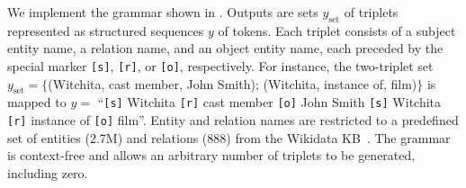 We implement the grammar shown in .
Outputs are sets $y_\text{set}$ of triplets represented as structured sequences $y$ of tokens.
Each triplet consists of a subject entity name, a relation name, and an object entity name, each preceded by the special marker \texttt{[s]}, \texttt{[r]}, or \texttt{[o]}, respectively.
For instance, the two-triplet set
$y_\text{set}=\{$(Witchita, cast member, John Smith);
(Witchita, instance of, film)$\}$
is mapped to $y=$ ``\texttt{[s]} Witchita \texttt{[r]} cast member \texttt{[o]} John Smith \texttt{[s]} Witchita \texttt{[r]} instance of \texttt{[o]} film''.
Entity and relation names are restricted to a predefined set of entities (2.7M) and relations (888) from the Wikidata KB~\cite{wikidata}.
The grammar is context-free and allows an arbitrary number of triplets to be generated, including zero.



